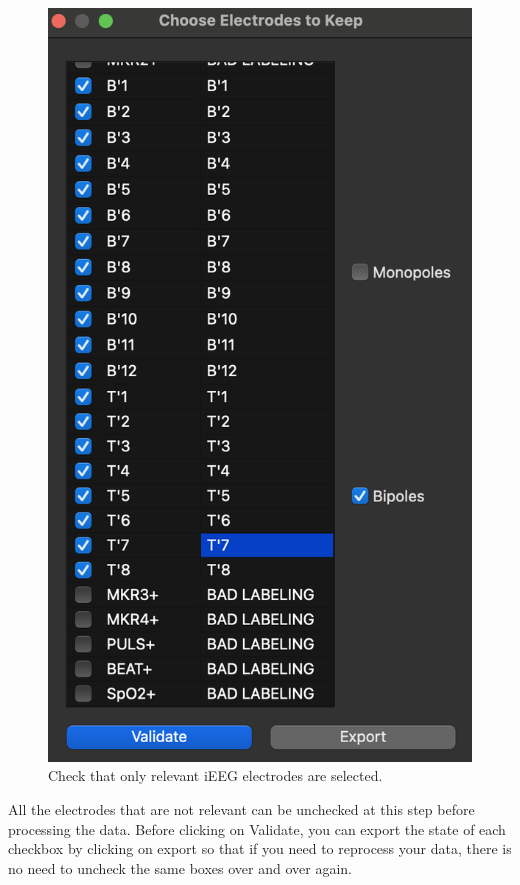 \documentclass[a4paper]{article}
\begin{document}
\begin{figure}[H]
\begin{center}
\includegraphics[scale=0.6]{ConnectCleaner.png}
\end{center}
\caption{\label{ConnectCleanerFolderUI}Check that only relevant iEEG electrodes are selected.}
\end{figure}

All the electrodes that are not relevant can be unchecked at this step before processing the data. 
Before clicking on Validate, you can export the state of each checkbox by clicking on export so that if you need to reprocess your data, there is no need to uncheck the same boxes over and over again.
\end{document}
